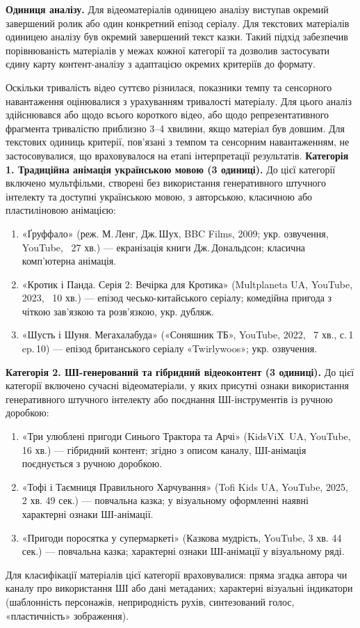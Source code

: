\documentclass[14pt, a4paper]{extreport}
\begin{document}
\textbf{Одиниця аналізу.}
Для відеоматеріалів одиницею аналізу виступав окремий завершений ролик або один конкретний епізод серіалу. Для текстових матеріалів одиницею аналізу був окремий завершений текст казки. Такий підхід забезпечив порівнюваність матеріалів у межах кожної категорії та дозволив застосувати єдину карту контент-аналізу з адаптацією окремих критеріїв до формату.

Оскільки тривалість відео суттєво різнилася, показники темпу та сенсорного навантаження оцінювалися з урахуванням тривалості матеріалу. Для цього аналіз здійснювався або щодо всього короткого відео, або щодо репрезентативного фрагмента тривалістю приблизно 3--4 хвилини, якщо матеріал був довшим. Для текстових одиниць критерії, пов'язані з темпом та сенсорним навантаженням, не застосовувалися, що враховувалося на етапі інтерпретації результатів.
\newpage
\textbf{Категорія 1. Традиційна анімація українською мовою (3 одиниці).}
До цієї категорії включено мультфільми, створені без використання генеративного штучного інтелекту та доступні українською мовою, з авторською, класичною або пластиліновою анімацією:
\begin{enumerate}
  \item «Ґруффало» (реж. М.\,Ленг, Дж.\,Шух, BBC Films, 2009; укр. озвучення, YouTube, ~27 хв.) --- екранізація книги Дж.\,Дональдсон; класична комп'ютерна анімація.
  \item «Кротик і Панда. Серія 2: Вечірка для Кротика» (Multplaneta UA, YouTube, 2023, ~10 хв.) --- епізод чесько-китайського серіалу; комедійна пригода з чіткою зав'язкою та розв'язкою, укр. дубляж.
  \item «Шусть і Шуня. Мегахалабуда» («Соняшник ТБ», YouTube, 2022, ~7 хв., с.\,1 ep.\,10) --- епізод британського серіалу «Twirlywoos»; укр. озвучення.
\end{enumerate}

\textbf{Категорія 2. ШІ-генерований та гібридний відеоконтент (3 одиниці).}
До цієї категорії включено сучасні відеоматеріали, у яких присутні ознаки використання генеративного штучного інтелекту або поєднання ШІ-інструментів із ручною доробкою:
\begin{enumerate}
  \item «Три улюблені пригоди Синього Трактора та Арчі» (KidsViX~UA, YouTube, 16 хв.) --- гібридний контент; згідно з описом каналу, ШІ-анімація поєднується з ручною доробкою.
  \item «Тофі і Таємниця Правильного Харчування» (Tofi Kids UA, YouTube, 2025, 2 хв. 49 сек.) --- повчальна казка; у візуальному оформленні наявні характерні ознаки ШІ-анімації.
  \item «Пригоди поросятка у супермаркеті» (Казкова мудрість, YouTube, 3 хв. 44 сек.) --- повчальна казка; характерні ознаки ШІ-анімації у візуальному ряді.
\end{enumerate}
\newpage
Для класифікації матеріалів цієї категорії враховувалися: пряма згадка автора чи каналу про використання ШІ або дані метаданих; характерні візуальні індикатори (шаблонність персонажів, неприродність рухів, синтезований голос, «пластичність» зображення).
\end{document}
